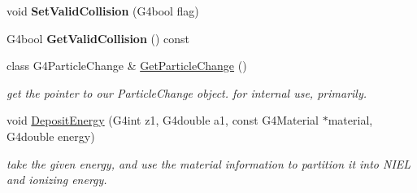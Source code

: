 \begin{DoxyCompactItemize}
\item 
\hypertarget{classG4ScreenedNuclearRecoil_a75b348643f84ad9824bb4efc7d9dc860}{void {\bfseries Set\-Valid\-Collision} (G4bool flag)}\label{classG4ScreenedNuclearRecoil_a75b348643f84ad9824bb4efc7d9dc860}

\item 
\hypertarget{classG4ScreenedNuclearRecoil_a5f1566375dfc829984e3f98e316e28ae}{G4bool {\bfseries Get\-Valid\-Collision} () const }\label{classG4ScreenedNuclearRecoil_a5f1566375dfc829984e3f98e316e28ae}

\item 
\hypertarget{classG4ScreenedNuclearRecoil_a06bd05510257f5ee6ad18d887a28926c}{class G4\-Particle\-Change \& \hyperlink{classG4ScreenedNuclearRecoil_a06bd05510257f5ee6ad18d887a28926c}{Get\-Particle\-Change} ()}\label{classG4ScreenedNuclearRecoil_a06bd05510257f5ee6ad18d887a28926c}

\begin{DoxyCompactList}\small\item\em get the pointer to our Particle\-Change object. for internal use, primarily. \end{DoxyCompactList}\item 
\hypertarget{classG4ScreenedNuclearRecoil_ae0ab6a6c98402cbf573ebda97a21f529}{void \hyperlink{classG4ScreenedNuclearRecoil_ae0ab6a6c98402cbf573ebda97a21f529}{Deposit\-Energy} (G4int z1, G4double a1, const G4\-Material $\ast$material, G4double energy)}\label{classG4ScreenedNuclearRecoil_ae0ab6a6c98402cbf573ebda97a21f529}

\begin{DoxyCompactList}\small\item\em take the given energy, and use the material information to partition it into N\-I\-E\-L and ionizing energy. \end{DoxyCompactList}\end{DoxyCompactItemize}
